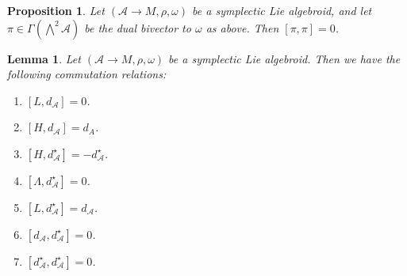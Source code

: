 \documentclass[10pt,a4paper]{amsart}
\newtheorem{prop}{Proposition}
\newtheorem{lemma}{Lemma}
\newcommand{\A}{\mathcal{A}}
\newcommand{\ra}{\rightarrow}
\begin{document}
\begin{prop}\label{PoissonBracketVanish}
    Let $(\A \ra M,\rho,\omega)$ be a symplectic Lie algebroid, and let $\pi \in \Gamma(\bigwedge^2\A)$ be the dual bivector to $\omega$ as above. Then $[\pi,\pi]=0$.
\end{prop}

\begin{lemma}\label{AlgebroidCommutators}
    Let $(\A \ra M,\rho,\omega)$ be a symplectic Lie algebroid. Then we have the following commutation relations:
    \begin{enumerate}
        \item $[L,d_\A]=0$.
        \item $[H,d_\A]=d_A$.
        \item $[H,d_\A^\star]=-d_\A^\star$.
        \item $[\Lambda , d_\A^\star]=0$.
        \item $[L,d_\A^\star]=d_\A$.
        \item $[d_\A,d_\A^\star]=0$.
        \item $[d_\A^\star,d_\A^\star]=0$.
    \end{enumerate}
\end{lemma}
\end{document}
